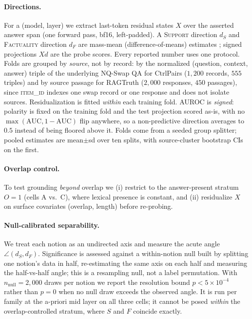 \paragraph{Directions.}
For a (model, layer) we extract last-token residual states $X$ over the asserted
answer span (one forward pass, bf16, left-padded). A \textsc{Support} direction
$d_S$ and \textsc{Factuality} direction $d_F$ are mass-mean
(difference-of-means) estimates \citep{marks2024geometry}; signed projections
$X d$ are the probe scores. Every reported number uses one protocol. Folds are grouped
by \emph{source}, not by record: by the normalized (question, context, answer) triple of
the underlying NQ-Swap QA for CtrlPairs ($1{,}200$ records, $555$ triples) and by source
passage for RAGTruth ($2{,}000$ responses, $450$ passages), since \textsc{item\_id}
indexes one swap record or one response and does not isolate sources. Residualization is
fitted \emph{within} each training fold. AUROC is \emph{signed}: polarity is fixed on
the training fold and the test projection scored as-is, with no
$\max(\mathrm{AUC},1{-}\mathrm{AUC})$ flip anywhere, so a non-predictive direction
averages to $0.5$ instead of being floored above it. Folds come from a seeded group
splitter; pooled estimates are mean$\pm$sd over ten splits, with source-cluster
bootstrap CIs on the first.

\paragraph{Overlap control.}
To test grounding \emph{beyond} overlap we (i) restrict to the answer-present
stratum $O{=}1$ (cells A vs.\ C), where lexical presence is constant, and
(ii) residualize $X$ on surface covariates (overlap, length) before re-probing.

\paragraph{Null-calibrated separability.}
We treat each notion as an undirected axis and measure the acute angle
$\angle(d_S,d_F)$. Significance is assessed against a within-notion null built by
splitting one notion's data in half, re-estimating the same axis on each half and
measuring the half-vs-half angle; this is a resampling null, not a label permutation.
With $n_{\mathrm{null}}{=}2{,}000$ draws per notion we report the resolution bound
$p{<}5{\times}10^{-4}$ rather than $p{=}0$ when no null draw exceeds the observed
angle. It is run per family at the a-priori mid layer on all three cells; it cannot be
posed \emph{within} the overlap-controlled stratum, where $S$ and $F$ coincide exactly.

